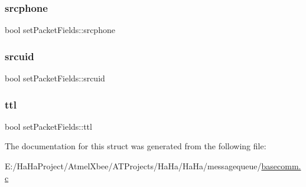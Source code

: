 \mbox{\label{structset_packet_fields_ae60b89f035169cd91e1fa56bf7114d98}} 
\subsubsection{\texorpdfstring{srcphone}{srcphone}}
{\footnotesize\ttfamily bool set\+Packet\+Fields\+::srcphone}

\mbox{\label{structset_packet_fields_a09e5a2e16205b8b6222913317983575b}} 
\subsubsection{\texorpdfstring{srcuid}{srcuid}}
{\footnotesize\ttfamily bool set\+Packet\+Fields\+::srcuid}

\mbox{\label{structset_packet_fields_a5f55df686bff2c7831b881c7562d0f15}} 
\subsubsection{\texorpdfstring{ttl}{ttl}}
{\footnotesize\ttfamily bool set\+Packet\+Fields\+::ttl}



The documentation for this struct was generated from the following file\+:\begin{DoxyCompactItemize}
\item 
E\+:/\+Ha\+Ha\+Project/\+Atmel\+Xbee/\+A\+T\+Projects/\+Ha\+Ha/\+Ha\+Ha/messagequeue/\hyperlink{basecomm_8c}{basecomm.\+c}\end{DoxyCompactItemize}
